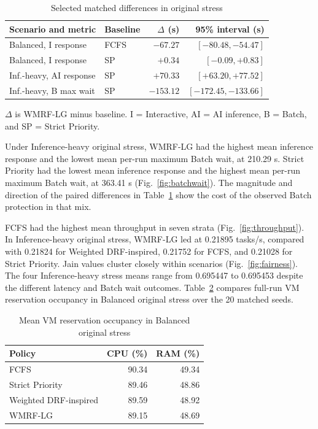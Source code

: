 \documentclass[conference]{IEEEtran}
\newcommand{\wmrf}{WMRF-LG}
\newcommand{\wdrf}{Weighted DRF-inspired}
\begin{document}
\begin{table}[t]
\caption{Selected matched differences in original stress}
\label{tab:paired}
\centering
\begin{tabular}{@{}llrr@{}}
\toprule
Scenario and metric & Baseline & $\Delta$ (s) & 95\% interval (s)\\
\midrule
Balanced, I response & FCFS & $-67.27$ & $[-80.48,-54.47]$\\
Balanced, I response & SP & $+0.34$ & $[-0.09,+0.83]$\\
Inf.-heavy, AI response & SP & $+70.33$ & $[+63.20,+77.52]$\\
Inf.-heavy, B max wait & SP & $-153.12$ & $[-172.45,-133.66]$\\
\bottomrule
\end{tabular}
\par\smallskip
{\footnotesize $\Delta$ is \wmrf{} minus baseline. I = Interactive, AI = AI inference, B = Batch, and SP = Strict Priority.}
\end{table}

Under Inference-heavy original stress, \wmrf{} had the highest mean inference response and the lowest mean per-run maximum Batch wait, at 210.29 s. Strict Priority had the lowest mean inference response and the highest mean per-run maximum Batch wait, at 363.41 s (Fig.~\ref{fig:batchwait}). The magnitude and direction of the paired differences in Table~\ref{tab:paired} show the cost of the observed Batch protection in that mix.

FCFS had the highest mean throughput in seven strata (Fig.~\ref{fig:throughput}). In Inference-heavy original stress, \wmrf{} led at 0.21895 tasks/s, compared with 0.21824 for \wdrf{}, 0.21752 for FCFS, and 0.21028 for Strict Priority. Jain values cluster closely within scenarios (Fig.~\ref{fig:fairness}). The four Inference-heavy stress means range from 0.695447 to 0.695453 despite the different latency and Batch wait outcomes. Table~\ref{tab:occupancy} compares full-run VM reservation occupancy in Balanced original stress over the 20 matched seeds.

\begin{table}[t]
\caption{Mean VM reservation occupancy in Balanced original stress}
\label{tab:occupancy}
\centering
\begin{tabular}{@{}lrr@{}}
\toprule
Policy & CPU (\%) & RAM (\%)\\
\midrule
FCFS & 90.34 & 49.34\\
Strict Priority & 89.46 & 48.86\\
\wdrf{} & 89.59 & 48.92\\
\wmrf{} & 89.15 & 48.69\\
\bottomrule
\end{tabular}
\end{table}
\end{document}
